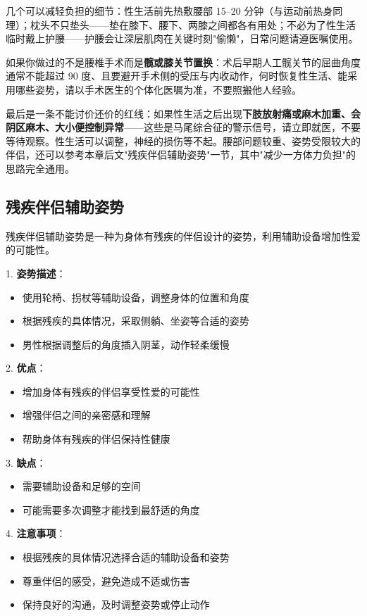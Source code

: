 \documentclass[12pt,UTF8]{ctexbook}
\begin{document}
几个可以减轻负担的细节：性生活前先热敷腰部 15--20 分钟（与运动前热身同理）；枕头不只垫头——垫在膝下、腰下、两膝之间都各有用处；不必为了性生活临时戴上护腰——护腰会让深层肌肉在关键时刻"偷懒"，日常问题请遵医嘱使用。

如果你做过的不是腰椎手术而是\textbf{髋或膝关节置换}：术后早期人工髋关节的屈曲角度通常不能超过 90 度、且要避开手术侧的受压与内收动作，何时恢复性生活、能采用哪些姿势，请以手术医生的个体化医嘱为准，不要照搬他人经验。

最后是一条不能讨价还价的红线：如果性生活之后出现\textbf{下肢放射痛或麻木加重、会阴区麻木、大小便控制异常}——这些是马尾综合征的警示信号，请立即就医，不要等待观察。性生活可以调整，神经的损伤等不起。腰部问题较重、姿势受限较大的伴侣，还可以参考本章后文"残疾伴侣辅助姿势"一节，其中"减少一方体力负担"的思路完全通用。

\subsection{残疾伴侣辅助姿势}

残疾伴侣辅助姿势是一种为身体有残疾的伴侣设计的姿势，利用辅助设备增加性爱的可能性。

1. \textbf{姿势描述}：
  \begin{itemize}
  \item 使用轮椅、拐杖等辅助设备，调整身体的位置和角度
  \item 根据残疾的具体情况，采取侧躺、坐姿等合适的姿势
  \item 男性根据调整后的角度插入阴茎，动作轻柔缓慢
  \end{itemize}

2. \textbf{优点}：
  \begin{itemize}
  \item 增加身体有残疾的伴侣享受性爱的可能性
  \item 增强伴侣之间的亲密感和理解
  \item 帮助身体有残疾的伴侣保持性健康
  \end{itemize}

3. \textbf{缺点}：
  \begin{itemize}
  \item 需要辅助设备和足够的空间
  \item 可能需要多次调整才能找到最舒适的角度
  \end{itemize}

4. \textbf{注意事项}：
  \begin{itemize}
  \item 根据残疾的具体情况选择合适的辅助设备和姿势
  \item 尊重伴侣的感受，避免造成不适或伤害
  \item 保持良好的沟通，及时调整姿势或停止动作
  \end{itemize}
\end{document}

